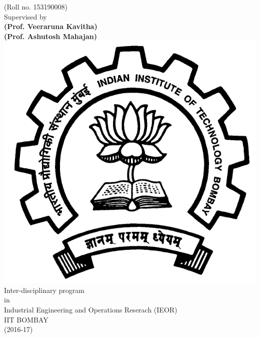 \begin{titlepage}
\begin{center}
	\Large
	(Roll no. 153190008)\\
	\vspace{0.5cm}
	\Large
	Supervised by\\
	\vspace{0.2cm}
	\Large
	\textbf{(Prof. Veeraruna Kavitha)}\\
	\textbf{(Prof. Ashutosh Mahajan)}\\
	\vspace{0.8cm}
	{\includegraphics[scale=0.1]{logo.jpg}}\\
	\Large
	Inter-disciplinary program\\
	\Large
	in\\
	\Large
	Industrial Engineering and Operations Reserach (IEOR)\\
	\Large
	IIT BOMBAY\\
	\Large
		(2016-17)
\end{center}
\end{titlepage}